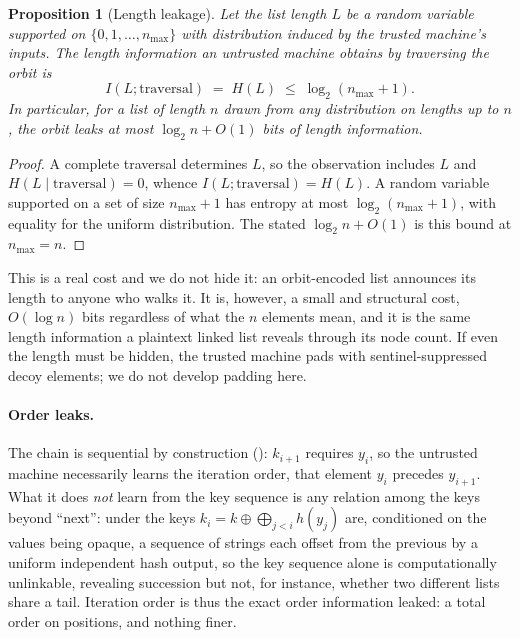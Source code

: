 \documentclass[11pt]{article}
\theoremstyle{definition}
\theoremstyle{plain}
\newtheorem{proposition}[theorem]{Proposition}
\theoremstyle{definition}
\theoremstyle{remark}
\begin{document}
\begin{proposition}[Length leakage]
\label{prop:length-leak}
Let the list length $L$ be a random variable supported on $\{0, 1,
\ldots, n_{\max}\}$ with distribution induced by the trusted machine's
inputs. The length information an untrusted machine obtains by
traversing the orbit is
\[
I(L; \text{traversal}) \;=\; H(L) \;\leq\; \log_2 (n_{\max} + 1).
\]
In particular, for a list of length $n$ drawn from any distribution on
lengths up to $n$, the orbit leaks at most $\log_2 n + O(1)$ bits of
length information.
\end{proposition}

\begin{proof}
A complete traversal determines $L$, so the observation includes $L$
and $H(L \mid \text{traversal}) = 0$, whence $I(L; \text{traversal}) =
H(L)$. A random variable supported on a set of size $n_{\max}+1$ has
entropy at most $\log_2(n_{\max}+1)$, with equality for the uniform
distribution. The stated $\log_2 n + O(1)$ is this bound at $n_{\max} =
n$.
\end{proof}

This is a real cost and we do not hide it: an orbit-encoded list
announces its length to anyone who walks it. It is, however, a small
and structural cost, $O(\log n)$ bits regardless of what the $n$
elements mean, and it is the same length information a plaintext linked
list reveals through its node count. If even the length must be hidden,
the trusted machine pads with sentinel-suppressed decoy elements; we do
not develop padding here.

\paragraph{Order leaks.} The chain is sequential by construction
(): $k_{i+1}$ requires $y_i$, so the
untrusted machine necessarily learns the iteration order, that element
$y_i$ precedes $y_{i+1}$. What it does \emph{not} learn from the key
sequence is any relation among the keys beyond \enquote{next}: under
 the keys $k_i = k \oplus \bigoplus_{j<i} h(y_j)$ are,
conditioned on the values being opaque, a sequence of strings each
offset from the previous by a uniform independent hash output, so the
key sequence alone is computationally unlinkable, revealing succession
but not, for instance, whether two different lists share a tail.
Iteration order is thus the exact order information leaked: a total
order on positions, and nothing finer.
\end{document}

